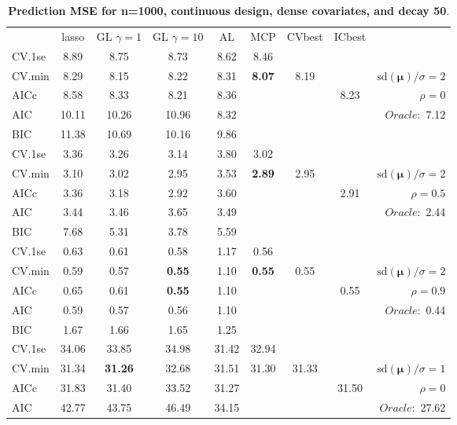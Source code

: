 \clearpage
\begin{table}\vspace{-.5cm}
\caption[l]{ { \bf Prediction MSE for n=1000, continuous design, 
dense covariates, and  decay  50}.}
\vspace{-.5cm}
\footnotesize{}
\begin{center}
\begin{tabular}{l*{7}{c}|r}
 & lasso & GL $\gamma=1$ & GL $\gamma=10$ & AL & MCP  & CVbest & ICbest  \\
\cline{1-9}
CV.1se & 8.89 & 8.75 & 8.73 & 8.62 & 8.46 & & & \\
CV.min & 8.29 & 8.15 & 8.22 & 8.31 & {\bf 8.07} & 8.19 & & $\mathrm{sd}(\mathbf{\mu})/\sigma=2$ \\
AICc & 8.58 & 8.33 & 8.21 & 8.36 & & & 8.23 &  $\rho=0$ \\
AIC & 10.11 & 10.26 & 10.96 & 8.32 & & & &  \multirow{2}{*}{$Oracle: $ 7.12} \\
BIC & 11.38 & 10.69 & 10.16 & 9.86 & & & &  \\
 \hline 
CV.1se & 3.36 & 3.26 & 3.14 & 3.80 & 3.02 & & & \\
CV.min & 3.10 & 3.02 & 2.95 & 3.53 & {\bf 2.89} & 2.95 & & $\mathrm{sd}(\mathbf{\mu})/\sigma=2$ \\
AICc & 3.36 & 3.18 & 2.92 & 3.60 & & & 2.91 &  $\rho=0.5$ \\
AIC & 3.44 & 3.46 & 3.65 & 3.49 & & & &  \multirow{2}{*}{$Oracle: $ 2.44} \\
BIC & 7.68 & 5.31 & 3.78 & 5.59 & & & &  \\
 \hline 
CV.1se & 0.63 & 0.61 & 0.58 & 1.17 & 0.56 & & & \\
CV.min & 0.59 & 0.57 & {\bf 0.55} & 1.10 & {\bf 0.55} & 0.55 & & $\mathrm{sd}(\mathbf{\mu})/\sigma=2$ \\
AICc & 0.65 & 0.61 & {\bf 0.55} & 1.10 & & & 0.55 &  $\rho=0.9$ \\
AIC & 0.59 & 0.57 & 0.56 & 1.10 & & & &  \multirow{2}{*}{$Oracle: $ 0.44} \\
BIC & 1.67 & 1.66 & 1.65 & 1.25 & & & &  \\
 \hline 
CV.1se & 34.06 & 33.85 & 34.98 & 31.42 & 32.94 & & & \\
CV.min & 31.34 & {\bf 31.26} & 32.68 & 31.51 & 31.30 & 31.33 & & $\mathrm{sd}(\mathbf{\mu})/\sigma=1$ \\
AICc & 31.83 & 31.40 & 33.52 & 31.27 & & & 31.50 &  $\rho=0$ \\
AIC & 42.77 & 43.75 & 46.49 & 34.15 & & & &  \multirow{2}{*}{$Oracle: $ 27.62} \\

\end{tabular}
\end{center}
\end{table}
